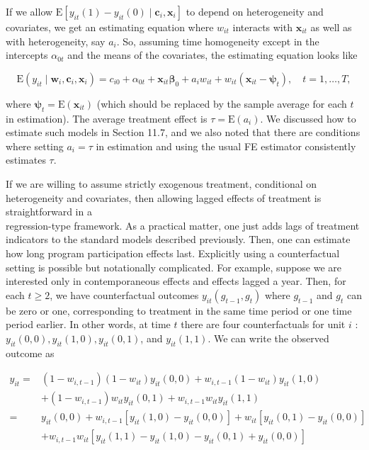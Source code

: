 \documentclass[10pt]{article}
\begin{document}
If we allow $\mathrm{E}\left[y_{i t}(1)-y_{i t}(0) \mid \mathbf{c}_{i}, \mathbf{x}_{i}\right]$ to depend on heterogeneity and covariates, we get an estimating equation where $w_{i t}$ interacts with $\mathbf{x}_{i t}$ as well as with heterogeneity, say $a_{i}$. So, assuming time homogeneity except in the intercepts $\alpha_{0 t}$ and the means of the covariates, the estimating equation looks like


\begin{equation*}
\mathrm{E}\left(y_{i t} \mid \mathbf{w}_{i}, \mathbf{c}_{i}, \mathbf{x}_{i}\right)=c_{i 0}+\alpha_{0 t}+\mathbf{x}_{i t} \boldsymbol{\beta}_{0}+a_{i} w_{i t}+w_{i t}\left(\mathbf{x}_{i t}-\boldsymbol{\psi}_{t}\right), \quad t=1, \ldots, T, \tag{21.134}
\end{equation*}


where $\boldsymbol{\psi}_{t}=\mathrm{E}\left(\mathbf{x}_{i t}\right)$ (which should be replaced by the sample average for each $t$ in estimation). The average treatment effect is $\tau=\mathrm{E}\left(a_{i}\right)$. We discussed how to estimate such models in Section 11.7, and we also noted that there are conditions where setting $a_{i}=\tau$ in estimation and using the usual FE estimator consistently estimates $\tau$.

If we are willing to assume strictly exogenous treatment, conditional on heterogeneity and covariates, then allowing lagged effects of treatment is straightforward in a\\
regression-type framework. As a practical matter, one just adds lags of treatment indicators to the standard models described previously. Then, one can estimate how long program participation effects last. Explicitly using a counterfactual setting is possible but notationally complicated. For example, suppose we are interested only in contemporaneous effects and effects lagged a year. Then, for each $t \geq 2$, we have counterfactual outcomes $y_{i t}\left(g_{t-1}, g_{t}\right)$ where $g_{t-1}$ and $g_{t}$ can be zero or one, corresponding to treatment in the same time period or one time period earlier. In other words, at time $t$ there are four counterfactuals for unit $i$ : $y_{i t}(0,0), y_{i t}(1,0), y_{i t}(0,1)$, and $y_{i t}(1,1)$. We can write the observed outcome as

$$
\begin{aligned}
y_{i t}= & \left(1-w_{i, t-1}\right)\left(1-w_{i t}\right) y_{i t}(0,0)+w_{i, t-1}\left(1-w_{i t}\right) y_{i t}(1,0) \\
& +\left(1-w_{i, t-1}\right) w_{i t} y_{i t}(0,1)+w_{i, t-1} w_{i t} y_{i t}(1,1) \\
= & y_{i t}(0,0)+w_{i, t-1}\left[y_{i t}(1,0)-y_{i t}(0,0)\right]+w_{i t}\left[y_{i t}(0,1)-y_{i t}(0,0)\right] \\
& +w_{i, t-1} w_{i t}\left[y_{i t}(1,1)-y_{i t}(1,0)-y_{i t}(0,1)+y_{i t}(0,0)\right]
\end{aligned}
$$
\end{document}
